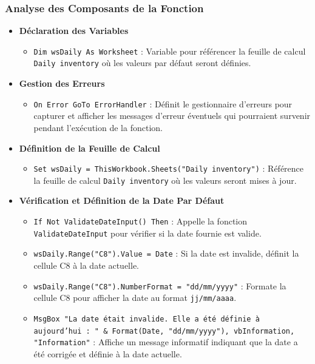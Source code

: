\documentclass[a4paper, oneside, 12pt, final]{extreport}
\begin{document}
\subsubsection{Analyse des Composants de la Fonction}
\begin{itemize}
  \item \textbf{Déclaration des Variables}

   \begin{itemize}

    \item \texttt{Dim wsDaily As Worksheet} : Variable pour référencer la feuille de calcul \texttt{Daily inventory} où les valeurs par défaut seront définies.
    \end{itemize}

  \item\textbf{Gestion des Erreurs}

\begin{itemize}
    \item \texttt{On Error GoTo ErrorHandler} : Définit le gestionnaire d'erreurs pour capturer et afficher les messages d'erreur éventuels qui pourraient survenir pendant l'exécution de la fonction.
\end{itemize}

   \item\textbf{Définition de la Feuille de Calcul}

\begin{itemize}
    \item \texttt{Set wsDaily = ThisWorkbook.Sheets("Daily inventory")} : Référence la feuille de calcul \texttt{Daily inventory} où les valeurs seront mises à jour.
\end{itemize}

    \item\textbf{Vérification et Définition de la Date Par Défaut}

\begin{itemize}
    \item \texttt{If Not ValidateDateInput() Then} : Appelle la fonction \texttt{ValidateDateInput} pour vérifier si la date fournie est valide.
    \item \texttt{wsDaily.Range("C8").Value = Date} : Si la date est invalide, définit la cellule C8 à la date actuelle.
    \item \texttt{wsDaily.Range("C8").NumberFormat = "dd/mm/yyyy"} : Formate la cellule C8 pour afficher la date au format \texttt{jj/mm/aaaa}.
    \item \texttt{MsgBox "La date était invalide. Elle a été définie à aujourd'hui : " \& Format(Date, "dd/mm/yyyy"), vbInformation, "Information"} : Affiche un message informatif indiquant que la date a été corrigée et définie à la date actuelle.
\end{itemize}


\end{itemize}
\end{document}
